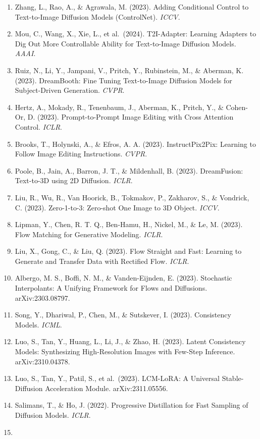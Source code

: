 \begin{enumerate}
\item
  Zhang, L., Rao, A., \& Agrawala, M. (2023). Adding Conditional Control to Text-to-Image Diffusion Models (ControlNet). \emph{ICCV}.
\item
  Mou, C., Wang, X., Xie, L., et al.~(2024). T2I-Adapter: Learning Adapters to Dig Out More Controllable Ability for Text-to-Image Diffusion Models. \emph{AAAI}.
\item
  Ruiz, N., Li, Y., Jampani, V., Pritch, Y., Rubinstein, M., \& Aberman, K. (2023). DreamBooth: Fine Tuning Text-to-Image Diffusion Models for Subject-Driven Generation. \emph{CVPR}.
\item
  Hertz, A., Mokady, R., Tenenbaum, J., Aberman, K., Pritch, Y., \& Cohen-Or, D. (2023). Prompt-to-Prompt Image Editing with Cross Attention Control. \emph{ICLR}.
\item
  Brooks, T., Holynski, A., \& Efros, A. A. (2023). InstructPix2Pix: Learning to Follow Image Editing Instructions. \emph{CVPR}.
\item
  Poole, B., Jain, A., Barron, J. T., \& Mildenhall, B. (2023). DreamFusion: Text-to-3D using 2D Diffusion. \emph{ICLR}.
\item
  Liu, R., Wu, R., Van Hoorick, B., Tokmakov, P., Zakharov, S., \& Vondrick, C. (2023). Zero-1-to-3: Zero-shot One Image to 3D Object. \emph{ICCV}.
\item
  Lipman, Y., Chen, R. T. Q., Ben-Hamu, H., Nickel, M., \& Le, M. (2023). Flow Matching for Generative Modeling. \emph{ICLR}.
\item
  Liu, X., Gong, C., \& Liu, Q. (2023). Flow Straight and Fast: Learning to Generate and Transfer Data with Rectified Flow. \emph{ICLR}.
\item
  Albergo, M. S., Boffi, N. M., \& Vanden-Eijnden, E. (2023). Stochastic Interpolants: A Unifying Framework for Flows and Diffusions. arXiv:2303.08797.
\item
  Song, Y., Dhariwal, P., Chen, M., \& Sutskever, I. (2023). Consistency Models. \emph{ICML}.
\item
  Luo, S., Tan, Y., Huang, L., Li, J., \& Zhao, H. (2023). Latent Consistency Models: Synthesizing High-Resolution Images with Few-Step Inference. arXiv:2310.04378.
\item
  Luo, S., Tan, Y., Patil, S., et al.~(2023). LCM-LoRA: A Universal Stable-Diffusion Acceleration Module. arXiv:2311.05556.
\item
  Salimans, T., \& Ho, J. (2022). Progressive Distillation for Fast Sampling of Diffusion Models. \emph{ICLR}.
\item

\end{enumerate}
